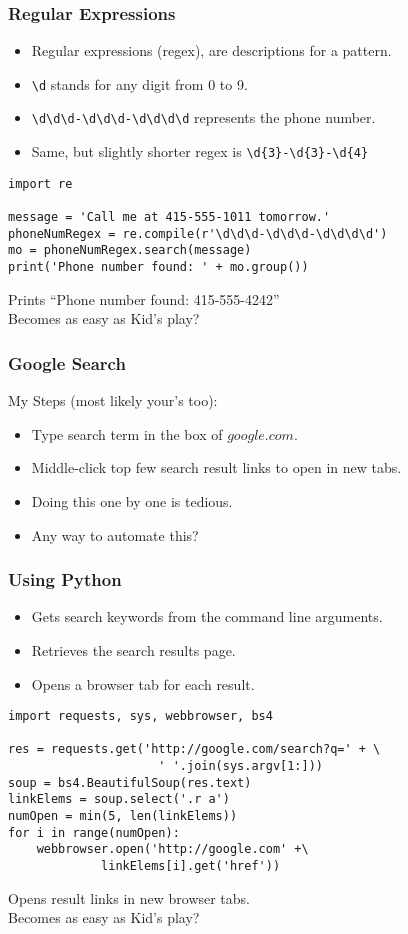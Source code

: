 \begin{frame}[fragile]\frametitle{Regular Expressions}
\begin{itemize}
\item Regular expressions (regex), are descriptions for a pattern.
\item \lstinline{\d} stands for any digit from 0 to 9.
\item \lstinline{\d\d\d-\d\d\d-\d\d\d\d} represents the phone number.
\item Same, but slightly shorter regex is \lstinline|\d{3}-\d{3}-\d{4}|
\end{itemize}
\begin{lstlisting}
import re

message = 'Call me at 415-555-1011 tomorrow.'
phoneNumRegex = re.compile(r'\d\d\d-\d\d\d-\d\d\d\d')
mo = phoneNumRegex.search(message)
print('Phone number found: ' + mo.group())
\end{lstlisting}
Prints ``Phone number found: 415-555-4242'' \\
Becomes as easy as Kid's play?
\end{frame}

\begin{frame}[fragile]\frametitle{Google Search}
My Steps (most likely your's too):
\begin{itemize}
\item Type search term in the box of $google.com$.
\item Middle-click top few search result links to open in new tabs.
\item Doing this one by one is tedious.
\item Any way to automate this?
\end{itemize}
\end{frame}


\begin{frame}[fragile]\frametitle{Using Python}
\begin{itemize}
\item Gets search keywords from the command line arguments.
\item Retrieves the search results page.
\item Opens a browser tab for each result.
\end{itemize}
\begin{lstlisting}
import requests, sys, webbrowser, bs4

res = requests.get('http://google.com/search?q=' + \
					 ' '.join(sys.argv[1:]))
soup = bs4.BeautifulSoup(res.text)
linkElems = soup.select('.r a')
numOpen = min(5, len(linkElems))
for i in range(numOpen):
    webbrowser.open('http://google.com' +\
    		 linkElems[i].get('href'))
\end{lstlisting}
Opens result links in new browser tabs. \\
Becomes as easy as Kid's play?
\end{frame}

